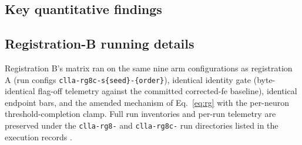 \subsection{Key quantitative findings}



\subsection{Registration-B running details}

Registration B's matrix ran on the same nine arm configurations as
registration A (run configs \texttt{clla-rg8c-\allowbreak s\{seed\}-\allowbreak\{order\}}), identical
identity gate (byte-identical flag-off telemetry against the committed
corrected-fe baseline), identical endpoint bars, and the amended
mechanism of Eq.~\eqref{eq:rg} with the per-neuron threshold-completion
clamp. Full run inventories and per-run telemetry are preserved under
the \texttt{clla-rg8-} and \texttt{clla-rg8c-} run directories listed
in the execution records \cite{rg8,rg8c}.